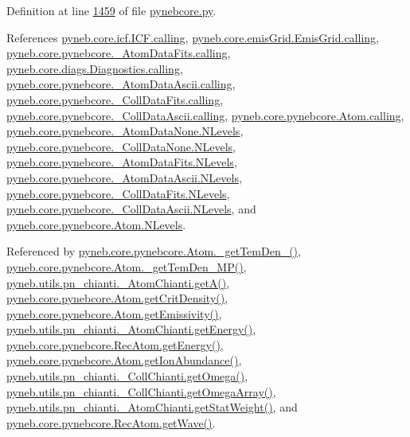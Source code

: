 Definition at line \hyperlink{pynebcore_8py_source_l01459}{1459} of file \hyperlink{pynebcore_8py_source}{pynebcore.\+py}.



References \hyperlink{icf_8py_source_l00016}{pyneb.\+core.\+icf.\+I\+C\+F.\+calling}, \hyperlink{emis_grid_8py_source_l00041}{pyneb.\+core.\+emis\+Grid.\+Emis\+Grid.\+calling}, \hyperlink{pynebcore_8py_source_l00090}{pyneb.\+core.\+pynebcore.\+\_\+\+Atom\+Data\+Fits.\+calling}, \hyperlink{diags_8py_source_l00169}{pyneb.\+core.\+diags.\+Diagnostics.\+calling}, \hyperlink{pynebcore_8py_source_l00311}{pyneb.\+core.\+pynebcore.\+\_\+\+Atom\+Data\+Ascii.\+calling}, \hyperlink{pynebcore_8py_source_l00568}{pyneb.\+core.\+pynebcore.\+\_\+\+Coll\+Data\+Fits.\+calling}, \hyperlink{pynebcore_8py_source_l00918}{pyneb.\+core.\+pynebcore.\+\_\+\+Coll\+Data\+Ascii.\+calling}, \hyperlink{pynebcore_8py_source_l01175}{pyneb.\+core.\+pynebcore.\+Atom.\+calling}, \hyperlink{pynebcore_8py_source_l00062}{pyneb.\+core.\+pynebcore.\+\_\+\+Atom\+Data\+None.\+N\+Levels}, \hyperlink{pynebcore_8py_source_l00075}{pyneb.\+core.\+pynebcore.\+\_\+\+Coll\+Data\+None.\+N\+Levels}, \hyperlink{pynebcore_8py_source_l00155}{pyneb.\+core.\+pynebcore.\+\_\+\+Atom\+Data\+Fits.\+N\+Levels}, \hyperlink{pynebcore_8py_source_l00404}{pyneb.\+core.\+pynebcore.\+\_\+\+Atom\+Data\+Ascii.\+N\+Levels}, \hyperlink{pynebcore_8py_source_l00637}{pyneb.\+core.\+pynebcore.\+\_\+\+Coll\+Data\+Fits.\+N\+Levels}, \hyperlink{pynebcore_8py_source_l00984}{pyneb.\+core.\+pynebcore.\+\_\+\+Coll\+Data\+Ascii.\+N\+Levels}, and \hyperlink{pynebcore_8py_source_l01260}{pyneb.\+core.\+pynebcore.\+Atom.\+N\+Levels}.



Referenced by \hyperlink{pynebcore_8py_source_l01803}{pyneb.\+core.\+pynebcore.\+Atom.\+\_\+get\+Tem\+Den\+\_()}, \hyperlink{pynebcore_8py_source_l01980}{pyneb.\+core.\+pynebcore.\+Atom.\+\_\+get\+Tem\+Den\+\_\+\+M\+P()}, \hyperlink{pn__chianti_8py_source_l00296}{pyneb.\+utils.\+pn\+\_\+chianti.\+\_\+\+Atom\+Chianti.\+get\+A()}, \hyperlink{pynebcore_8py_source_l01693}{pyneb.\+core.\+pynebcore.\+Atom.\+get\+Crit\+Density()}, \hyperlink{pynebcore_8py_source_l01716}{pyneb.\+core.\+pynebcore.\+Atom.\+get\+Emissivity()}, \hyperlink{pn__chianti_8py_source_l00346}{pyneb.\+utils.\+pn\+\_\+chianti.\+\_\+\+Atom\+Chianti.\+get\+Energy()}, \hyperlink{pynebcore_8py_source_l02811}{pyneb.\+core.\+pynebcore.\+Rec\+Atom.\+get\+Energy()}, \hyperlink{pynebcore_8py_source_l02110}{pyneb.\+core.\+pynebcore.\+Atom.\+get\+Ion\+Abundance()}, \hyperlink{pn__chianti_8py_source_l00484}{pyneb.\+utils.\+pn\+\_\+chianti.\+\_\+\+Coll\+Chianti.\+get\+Omega()}, \hyperlink{pn__chianti_8py_source_l00461}{pyneb.\+utils.\+pn\+\_\+chianti.\+\_\+\+Coll\+Chianti.\+get\+Omega\+Array()}, \hyperlink{pn__chianti_8py_source_l00323}{pyneb.\+utils.\+pn\+\_\+chianti.\+\_\+\+Atom\+Chianti.\+get\+Stat\+Weight()}, and \hyperlink{pynebcore_8py_source_l02623}{pyneb.\+core.\+pynebcore.\+Rec\+Atom.\+get\+Wave()}.


